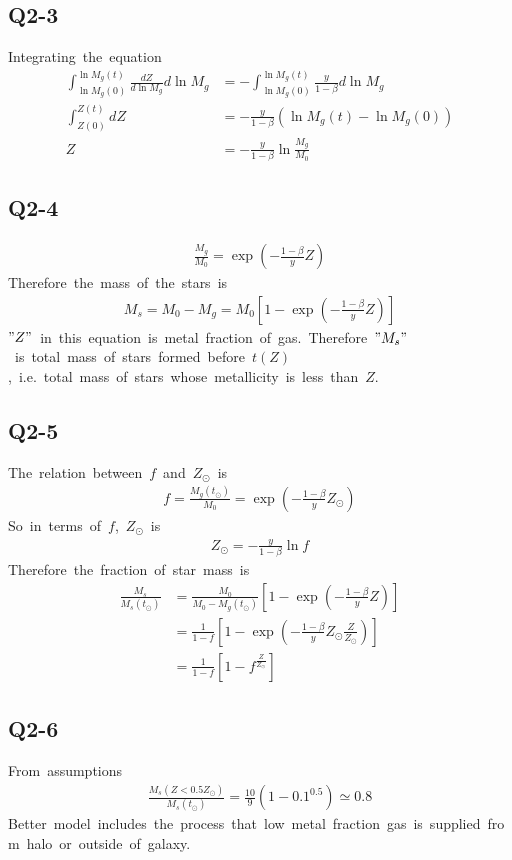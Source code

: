 \subsection{Q2-3}
Integrating\ the\ equation
\begin{align}
    \int^{\ln{M_g(t)}}_{\ln{M_g(0)}}\frac{dZ}{d\ln{M_g}}d\ln{M_g}&=-\int^{\ln{M_g(t)}}_{\ln{M_g(0)}}\frac{y}{1-\beta}d\ln{M_g}\nonumber\\
    \int^{Z(t)}_{Z(0)}dZ&=-\frac{y}{1-\beta}\left(\ln{M_g(t)}-\ln{M_g(0)}\right)\nonumber\\
    Z&=-\frac{y}{1-\beta}\ln{\frac{M_g}{M_0}}
\end{align}
\subsection{Q2-4}
\begin{align*}
    \frac{M_g}{M_0}=\exp(-\frac{1-\beta}{y}Z)
\end{align*}
Therefore\ the\ mass\ of\ the\ stars\ is
\begin{align}
    M_s=M_0-M_g=M_0\left[1-\exp(-\frac{1-\beta}{y}Z)\right]
\end{align}
$"Z"$\ in\ this\ equation\ is\ metal\ fraction\ of\ gas.\ Therefore\ $"M_s"$\ is\ total\ mass\ of\ stars\ formed\ before\ $t(Z)$,\ i.e.\ total\ mass\ of\ stars\ whose\ metallicity\ is\ less\ than\ $Z$.
\subsection{Q2-5}
The\ relation\ between\ $f$\ and\ $Z_{\odot}$\ is
\begin{align*}
    f=\frac{M_g(t_{\odot})}{M_0}=\exp(-\frac{1-\beta}{y}Z_{\odot})
\end{align*}
So\ in\ terms\ of\ $f$,\ $Z_{\odot}$\ is
\begin{align*}
    Z_{\odot}=-\frac{y}{1-\beta}\ln{f}
\end{align*}
Therefore\ the\ fraction\ of\ star\ mass\ is
\begin{align}
    \frac{M_s}{M_s(t_{\odot})}&=\frac{M_0}{M_0-M_g(t_{\odot})}\left[1-\exp(-\frac{1-\beta}{y}Z)\right]\nonumber\\
    &=\frac{1}{1-f}\left[1-\exp(-\frac{1-\beta}{y}Z_{\odot}\frac{Z}{Z_{\odot}})\right]\nonumber\\
    &=\frac{1}{1-f}\left[1-f^{\frac{Z}{Z_{\odot}}}\right]
\end{align}
\subsection{Q2-6}
From\ assumptions
\begin{align}
    \frac{M_s(Z<0.5Z_{\odot})}{M_s(t_{\odot})}=\frac{10}{9}\left(1-0.1^{0.5}\right)\simeq0.8
\end{align}
Better\ model\ includes\ the\ process\ that\ low\ metal\ fraction\ gas\ is\ supplied\ from\ halo\ or\ outside\ of\ galaxy.

